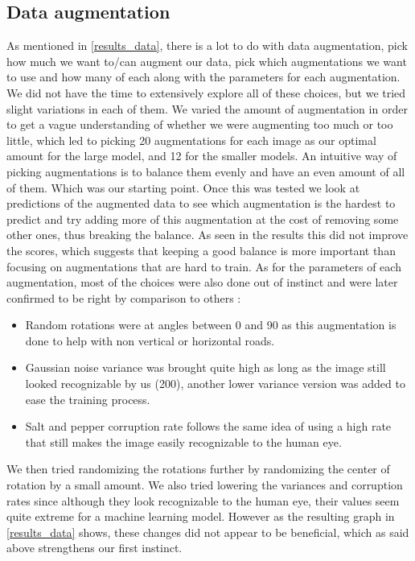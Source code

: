 \documentclass[10pt,conference,compsocconf]{IEEEtran}
\begin{document}
\subsection{Data augmentation}
As mentioned in \ref{results_data}, there is a lot to do with data augmentation, pick how much we want to/can augment our data, pick which augmentations we want to use and how many of each along with the parameters for each augmentation. We did not have the time to extensively explore all of these choices, but we tried slight variations in each of them.
\newline
We varied the amount of augmentation in order to get a vague understanding of whether we were augmenting too much or too little, which led to picking 20 augmentations for each image as our optimal amount for the large model, and 12 for the smaller models.
\newline
An intuitive way of picking augmentations is to balance them evenly and have an even amount of all of them. Which was our starting point. Once this was tested we look at predictions of the augmented data to see which augmentation is the hardest to predict and try adding more of this augmentation at the cost of removing some other ones, thus breaking the balance. As seen in the results this did not improve the scores, which suggests that keeping a good balance is more important than focusing on augmentations that are hard to train.
\newline
As for the parameters of each augmentation, most of the choices were also done out of instinct and were later confirmed to be right by comparison to others : 
\begin{itemize}
\item Random rotations were at angles between 0 and 90 as this augmentation is done to help with non vertical or horizontal roads.
\item Gaussian noise variance was brought quite high as long as the image still looked recognizable by us (200), another lower variance version was added to ease the training process.
\item Salt and pepper corruption rate follows the same idea of using a high rate that still makes the image easily recognizable to the human eye.
\end{itemize}
We then tried randomizing the rotations further by randomizing the center of rotation by a small amount. We also tried lowering the variances and corruption rates since although they look recognizable to the human eye, their values seem quite extreme for a machine learning model. However as the resulting graph in \ref{results_data} shows, these changes did not appear to be beneficial, which as said above strengthens our first instinct.
\end{document}
